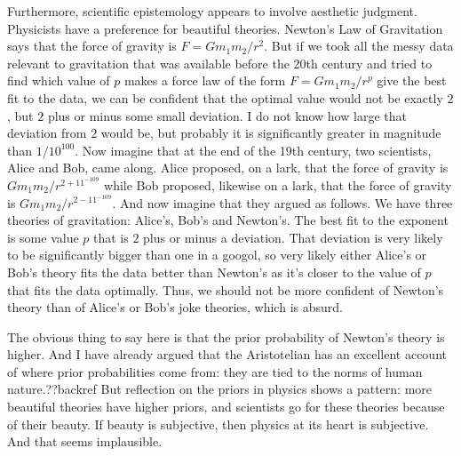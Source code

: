 Furthermore, scientific epistemology appears to involve aesthetic judgment. 
Physicists have a preference for beautiful theories. Newton's Law of Gravitation says that the force of gravity
is $F=Gm_1m_2/r^2$. But if we took all the messy data relevant to gravitation that was available before the 20th century
and tried to find which value of $p$ makes a force law of the form $F=Gm_1m_2/r^p$ give the best fit to the data,
we can be confident that the optimal value would not be exactly $2$, but $2$ plus or minus some small deviation.
I do not know how large that deviation from $2$ would be, but probably it is significantly greater in magnitude than $1/10^{100}$. 
Now imagine that at the end of the 19th century, two scientists, Alice and Bob, 
came along. Alice proposed, on a lark, that the force of gravity is $Gm_1m_2/r^{2+11^{-109}}$ while Bob proposed,
likewise on a lark, that the force 
of gravity is $Gm_1m_2/r^{2-11^{-109}}$. And now imagine that they argued as follows. We have three theories of
gravitation: Alice's, Bob's and Newton's. The best fit to the exponent is some value $p$ that is $2$ plus or minus
a deviation. That deviation is very likely to be significantly bigger than one in a googol, so very likely either
Alice's or Bob's theory fits the data better than Newton's as it's closer to the value of $p$ that fits the data
optimally. Thus, we should not be more confident of Newton's
theory than of Alice's or Bob's joke theories, which is absurd.

The obvious thing to say here is that the prior probability of Newton's theory is higher. And I have already
argued that the Aristotelian has an excellent account of where prior probabilities come from: they are tied
to the norms of human nature.??backref But reflection on the priors in physics shows a pattern: more
beautiful theories have higher priors, and scientists go for these theories because of their beauty. If
beauty is subjective, then physics at its heart is subjective. And that seems implausible. 

